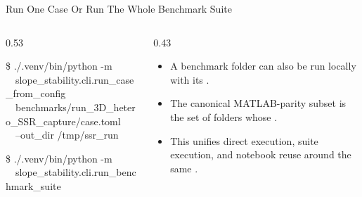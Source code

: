 \documentclass[aspectratio=169,10pt]{beamer}
\begin{document}
\begin{frame}{Run One Case Or Run The Whole Benchmark Suite}
\small
\begin{columns}[T,totalwidth=\textwidth]
\begin{column}{0.53\textwidth}
\begin{pseudobox}
\$ ./.venv/bin/python -m\\
\ \ slope\_stability.cli.run\_case\_from\_config\\
\ \ benchmarks/run\_3D\_hetero\_SSR\_capture/case.toml\\
\ \ --out\_dir /tmp/ssr\_run
\end{pseudobox}
\begin{pseudobox}
\$ ./.venv/bin/python -m\\
\ \ slope\_stability.cli.run\_benchmark\_suite
\end{pseudobox}
\end{column}
\begin{column}{0.43\textwidth}
\begin{softbox}
\begin{itemize}
  \item A benchmark folder can also be run locally with its .
  \item The canonical MATLAB-parity subset is the set of folders whose .
  \item This unifies direct execution, suite execution, and notebook reuse around the same .
\end{itemize}
\end{softbox}
\end{column}
\end{columns}
\end{frame}
\end{document}
